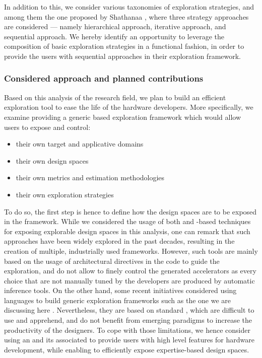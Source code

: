         In addition to this, we consider various taxonomies of exploration strategies, and among them the one proposed by Shathanaa \etal{} \cite{sa_design_2018}, where three strategy approaches are considered --- namely hierarchical approach, iterative approach, and sequential approach.
        We hereby identify an opportunity to leverage the composition of basic exploration strategies in a functional fashion, in order to provide the users with sequential approaches in their exploration framework.
    
    \subsubsection{Considered approach and planned contributions}
        Based on this analysis of the  research field, we plan to build an efficient exploration tool to ease the life of the hardware developers.
        More specifically, we examine providing a generic  based exploration framework which would allow users to expose and control:
        \begin{itemize}
            \setlength\itemsep{-0.2cm}
            \item their own target and applicative domains
            \item their own design spaces
            \item their own metrics and estimation methodologies
            \item their own exploration strategies
        \end{itemize}
    
\clearpage
        To do so, the first step is hence to define how the design spaces are to be exposed in the framework.
        While we considered the usage of both  and -based techniques for exposing explorable design spaces in this analysis, one can remark that such approaches have been widely explored in the past decades, resulting in the creation of multiple, industrially used frameworks.
        However, such tools are mainly based on the usage of architectural directives in the code to guide the exploration, and do not allow to finely control the generated accelerators as every choice that are not manually tuned by the developers are produced by automatic inference tools.
        On the other hand, some recent initiatives considered using  languages to build generic exploration frameworks such as the one we are discussing here \cite{paletti_dovado_2021}.
        Nevertheless, they are based on standard , which are difficult to use and apprehend, and do not benefit from emerging paradigms to increase the productivity of the designers.
        To cope with those limitations, we hence consider using an  and its associated  to provide users with high level features for hardware development, while enabling to efficiently expose expertise-based design spaces.

